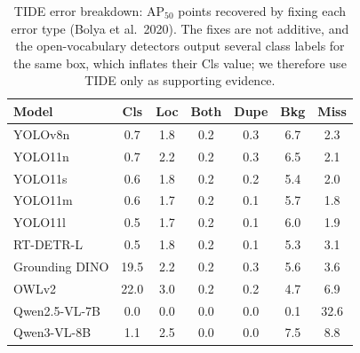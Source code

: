 \begin{table}[!ht]
\centering
\small
\setlength{\tabcolsep}{3.5pt}
\begin{tabular}{lcccccc}
\toprule
Model & Cls & Loc & Both & Dupe & Bkg & Miss \\
\midrule
YOLOv8n & 0.7 & 1.8 & 0.2 & 0.3 & 6.7 & 2.3 \\
YOLO11n & 0.7 & 2.2 & 0.2 & 0.3 & 6.5 & 2.1 \\
YOLO11s & 0.6 & 1.8 & 0.2 & 0.2 & 5.4 & 2.0 \\
YOLO11m & 0.6 & 1.7 & 0.2 & 0.1 & 5.7 & 1.8 \\
YOLO11l & 0.5 & 1.7 & 0.2 & 0.1 & 6.0 & 1.9 \\
RT-DETR-L & 0.5 & 1.8 & 0.2 & 0.1 & 5.3 & 3.1 \\
Grounding DINO & 19.5 & 2.2 & 0.2 & 0.3 & 5.6 & 3.6 \\
OWLv2 & 22.0 & 3.0 & 0.2 & 0.2 & 4.7 & 6.9 \\
Qwen2.5-VL-7B & 0.0 & 0.0 & 0.0 & 0.0 & 0.1 & 32.6 \\
Qwen3-VL-8B & 1.1 & 2.5 & 0.0 & 0.0 & 7.5 & 8.8 \\
\bottomrule
\end{tabular}
\caption{TIDE error breakdown: AP$_{50}$ points recovered by fixing each error type (Bolya et al.\ 2020). The fixes are not additive, and the open-vocabulary detectors output several class labels for the same box, which inflates their Cls value; we therefore use TIDE only as supporting evidence.}
\label{tab:tide}
\end{table}
